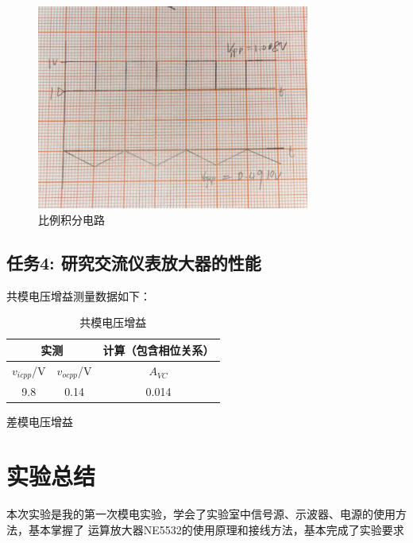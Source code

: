 \documentclass[a4paper,11pt,UTF8]{article}
\begin{document}
\begin{figure}[H]
	\centering
	\includegraphics[width=0.8\textwidth]{1.10.jpg}
	\caption{比例积分电路}
\end{figure}

\subsection{任务4: 研究交流仪表放大器的性能}
共模电压增益测量数据如下：

\begin{table}[htbp]
    \centering
    \caption{共模电压增益}
    \label{lable5}
    \begin{tabular}{|c|c|c|}
        \hline
        \multicolumn{2}{|c|}{实测} & 计算（包含相位关系） \\
        \hline
        $v_{icpp}$/V & $v_{ocpp}$/V & $A_{VC}$ \\
        \hline
        9.8 & 0.14 & 0.014\\
        \hline
    \end{tabular}
\end{table}

差模电压增益

\section{实验总结}
本次实验是我的第一次模电实验，学会了实验室中信号源、示波器、电源的使用方法，基本掌握了
运算放大器NE5532的使用原理和接线方法，基本完成了实验要求
\end{document}
